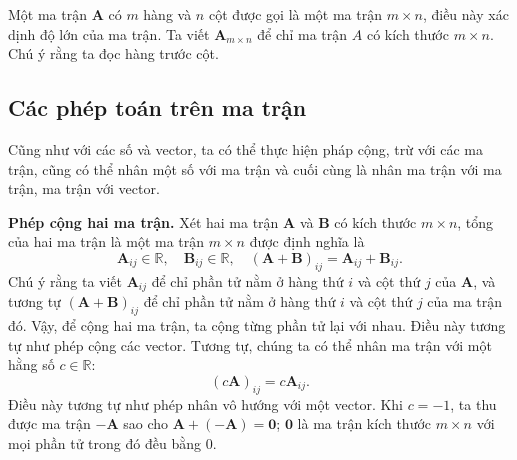 Một ma trận \(\mathbf{A}\) có \(m\) hàng và \(n\) cột được gọi là một ma trận \(m\times n\), điều này xác dịnh độ lớn của ma trận. Ta viết \(\mathbf{A}_{m\times n}\) để chỉ ma trận \(A\) có kích thước \(m\times n\). Chú ý rằng ta đọc hàng trước cột. 


\subsection{Các phép toán trên ma trận}
Cũng như với các số và vector, ta có thể thực hiện pháp cộng, trừ với các ma trận, cũng có thể nhân một số với ma trận và cuối cùng là nhân ma trận với ma trận, ma trận với vector. 
\vspace{8pt}

\textbf{Phép cộng hai ma trận.} Xét hai ma trận \(\mathbf{A}\) và \(\mathbf{B}\) có kích thước \(m\times n\), tổng của hai ma trận là một ma trận \(m\times n\) được định nghĩa là 
\begin{equation}
   \mathbf{A}_{ij}\in\mathbb{R},\quad \mathbf{B}_{ij}\in\mathbb{R},\quad 
    (\mathbf{A}+\mathbf{B})_{ij}=\mathbf{A}_{ij}+\mathbf{B}_{ij}.
\end{equation}
Chú ý rằng ta viết \(\mathbf{A}_{ij}\) để chỉ phần tử nằm ở hàng thứ \(i\) và cột thứ \(j\) của \(\mathbf{A}\), và tương tự \((\mathbf{A+B})_{ij}\) để chỉ phần tử nằm ở hàng thứ \(i\) và cột thứ \(j\) của ma trận đó. Vậy, để cộng hai ma trận, ta cộng từng phần tử lại với nhau. Điều này tương tự như phép cộng các vector.
Tương tự, chúng ta có thể nhân ma trận với một hằng số \(c\in\mathbb{R}\):
\begin{equation}
    (c\mathbf{A})_{ij}=c\mathbf{A}_{ij}.
\end{equation}
Điều này tương tự như phép nhân vô hướng với một vector. Khi \(c=-1\), ta thu được ma trận \(-\mathbf{A}\) sao cho \(\mathbf{A}+(-\mathbf{A})=\mathbf{0}\); \(\mathbf{0}\) là ma trận kích thước \(m\times n\) với mọi phần tử trong đó đều bằng \(0\).
\vspace{8pt}

